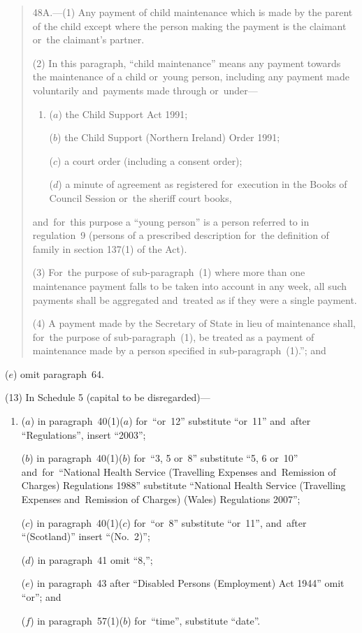 \documentclass[12pt,a4paper]{article}
\begin{document}
\begin{enumerate}
\begin{quotation}
\medskip

48A.---(1)  Any payment of child maintenance which is made by the parent of the child except where the person making the payment is the claimant or~the claimant’s partner.

(2) In this paragraph, “child maintenance” means any payment towards the maintenance of a child or~young person, including any payment made voluntarily and~payments made through or~under—
\begin{enumerate}\item[]
($a$) the Child Support Act 1991;

($b$) the Child Support (Northern Ireland) Order 1991;

($c$) a court order (including a consent order);

($d$) a minute of agreement as registered for~execution in the Books of Council Session or~the sheriff court books,
\end{enumerate}
and~for~this purpose a “young person” is a person referred to in regulation~9 (persons of a prescribed description for~the definition of family in section 137(1) of the Act).

(3) For~the purpose of sub-paragraph~(1) where more than one maintenance payment falls to be taken into account in any week, all such payments shall be aggregated and~treated as if they were a single payment.

(4) A payment made by the Secretary of State in lieu of maintenance shall, for~the purpose of sub-paragraph~(1), be treated as a payment of maintenance made by a person specified in sub-paragraph~(1).”; and
\end{quotation}

($e$) omit paragraph~64.
\end{enumerate}

(13) In Schedule 5 (capital to be disregarded)—
\begin{enumerate}\item[]
($a$) in paragraph~40(1)($a$)  for~“or~12” substitute “or~11” and~after “Regulations”, insert “2003”;

($b$) in paragraph~40(1)($b$)  for~“3, 5 or~8” substitute “5, 6 or~10” and~for~“National Health Service (Travelling Expenses and~Remission of Charges) Regulations 1988” substitute “National Health Service (Travelling Expenses and~Remission of Charges) (Wales) Regulations 2007”;

($c$) in paragraph~40(1)($c$)  for~“or~8” substitute “or~11”, and~after “(Scotland)” insert “(No.~2)”;

($d$) in paragraph~41 omit “8,”;

($e$) in paragraph~43 after “Disabled Persons (Employment) Act 1944” omit “or”; and

($f$) in paragraph~57(1)($b$)  for~“time”, substitute “date”.
\end{enumerate}
\end{document}
